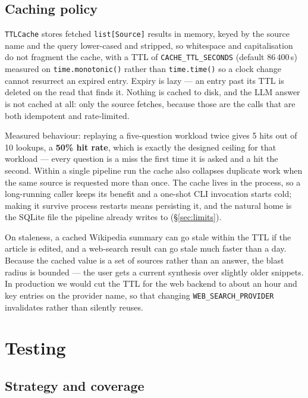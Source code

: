 \documentclass[11pt,a4paper]{article}
\begin{document}
\subsection{Caching policy}

\texttt{TTLCache} stores fetched \texttt{list[Source]} results in memory, keyed by the source
name and the query lower-cased and stripped, so whitespace and capitalisation do not fragment
the cache, with a TTL of \texttt{CACHE\_TTL\_SECONDS} (default 86\,400\,s) measured on
\texttt{time.monotonic()} rather than \texttt{time.time()} so a clock change cannot resurrect an
expired entry. Expiry is lazy --- an entry past its TTL is deleted on the read that finds it.
Nothing is cached to disk, and the LLM answer is not cached at all: only the source fetches,
because those are the calls that are both idempotent and rate-limited.

Measured behaviour: replaying a five-question workload twice gives 5 hits out of 10 lookups, a
\textbf{50\% hit rate}, which is exactly the designed ceiling for that workload --- every
question is a miss the first time it is asked and a hit the second. Within a single pipeline
run the cache also collapses duplicate work when the same source is requested more than once.
The cache lives in the process, so a long-running caller keeps its benefit and a one-shot CLI
invocation starts cold; making it survive process restarts means persisting it, and the natural
home is the SQLite file the pipeline already writes to (\S\ref{sec:limits}).

On staleness, a cached Wikipedia summary can go stale within the TTL if the article is edited,
and a web-search result can go stale much faster than a day. Because the cached value is a set of
sources rather than an answer, the blast radius is bounded --- the user gets a current synthesis
over slightly older snippets. In production we would cut the TTL for the web backend to about an
hour and key entries on the provider name, so that changing \texttt{WEB\_SEARCH\_PROVIDER}
invalidates rather than silently reuses.

\section{Testing}\label{sec:testing}

\subsection{Strategy and coverage}
\end{document}
